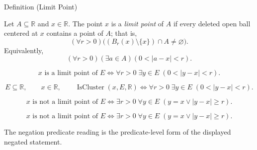 \begin{definitionbox}{Definition (Limit Point)}
\begin{definition}
\label{def:limit-point}
Let $A\subseteq\mathbb{R}$ and $x\in\mathbb{R}$.  The point $x$ is a
\emph{limit point} of $A$ if every deleted open ball centered at $x$ contains
a point of $A$; that is,
\[
  (\forall r>0)\bigl((B_r(x)\setminus\{x\})\cap A\neq\varnothing\bigr).
\]
Equivalently,
\[
  (\forall r>0)(\exists a\in A)(0<|a-x|<r).
\]
\end{definition}
\end{definitionbox}
\begin{remark*}
\[
x \text{ is a limit point of } E \Longleftrightarrow \forall r>0\;\exists y\in E\;(0<|y-x|<r).
\]
\end{remark*}

\begin{remark*}
\[
E\subseteq\mathbb{R},\qquad x\in\mathbb{R},\qquad
\operatorname{IsCluster}(x,E,\mathbb{R})
\Longleftrightarrow
\forall r>0\;\exists y\in E\;(0<|y-x|<r).
\]
\end{remark*}
\begin{remark*}
\[
x \text{ is not a limit point of } E \Longleftrightarrow \exists r>0\;\forall y\in E\;(y=x \lor |y-x|\geq r).
\]
\end{remark*}

\begin{remark*}
\[
x \text{ is not a limit point of } E \Longleftrightarrow \exists r>0\;\forall y\in E\;(y=x \lor |y-x|\geq r).
\]

The negation predicate reading is the predicate-level form of the displayed negated statement.
\end{remark*}

